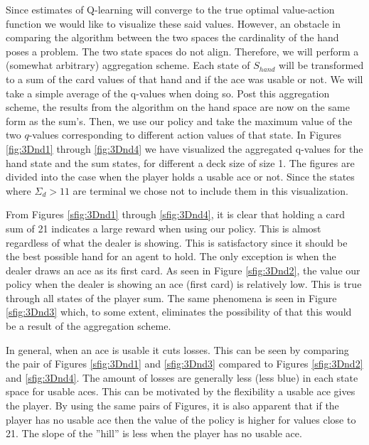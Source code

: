 Since estimates of Q-learning will converge to the true optimal value-action function we would like to visualize these said values. However, an obstacle in comparing the algorithm between the two spaces the cardinality of the hand poses a problem. The two state spaces do not align. Therefore, we will perform a (somewhat arbitrary) aggregation scheme. Each state of $S_{hand}$ will be transformed to a sum of the card values of that hand and if the ace was usable or not. We will take a simple average of the q-values when doing so. Post this aggregation scheme, the results from the algorithm on the hand space are now on the same form as the sum's. Then, we use our policy and take the maximum value of the two $q$-values corresponding to different action values of that state. In Figures \ref{fig:3Dnd1} through \ref{fig:3Dnd4} we have visualized the aggregated q-values for the hand state and the sum states, for different a deck size of size 1. The figures are divided into the case when the player holds a usable ace or not. Since the states where $\Sigma_d > 11$ are terminal we chose not to include them in this visualization.

From Figures  \ref{sfig:3Dnd1} through \ref{sfig:3Dnd4}, it is clear that holding a card sum of 21 indicates a large reward when using our policy. This is almost regardless of what the dealer is showing. This is satisfactory since it should be the best possible hand for an agent to hold.  The only exception is when the dealer draws an ace as its first card. As seen in Figure \ref{sfig:3Dnd2}, the value our policy when the dealer is showing an ace (first card) is relatively low. This is true through all states of the player sum. The same phenomena is seen in Figure \ref{sfig:3Dnd3} which, to some extent, eliminates the possibility of that this would be a result of the aggregation scheme. 

In general, when an ace is usable it cuts losses. This can be seen by comparing the pair of Figures \ref{sfig:3Dnd1} and \ref{sfig:3Dnd3} compared to Figures \ref{sfig:3Dnd2} and \ref{sfig:3Dnd4}. The amount of losses are generally less (less blue) in each state space for usable aces. This can be motivated by the flexibility a usable ace gives the player. By using the same pairs of Figures, it is also apparent that if the player has no usable ace then the value of the policy is higher for values close to 21. The slope of the ''hill'' is less when the player has no usable ace. 

